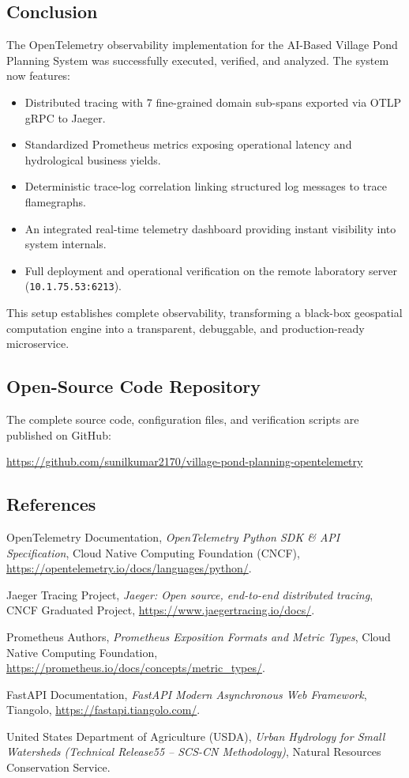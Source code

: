 \documentclass[11pt,a4paper]{article}
\begin{document}
\subsection{Conclusion}
The OpenTelemetry observability implementation for the AI-Based Village Pond Planning System was successfully executed, verified, and analyzed. The system now features:
\begin{itemize}[noitemsep]
    \item Distributed tracing with 7 fine-grained domain sub-spans exported via OTLP gRPC to Jaeger.
    \item Standardized Prometheus metrics exposing operational latency and hydrological business yields.
    \item Deterministic trace-log correlation linking structured log messages to trace flamegraphs.
    \item An integrated real-time telemetry dashboard providing instant visibility into system internals.
    \item Full deployment and operational verification on the remote laboratory server (\texttt{10.1.75.53:6213}).
\end{itemize}
This setup establishes complete observability, transforming a black-box geospatial computation engine into a transparent, debuggable, and production-ready microservice.

\subsection{Open-Source Code Repository}
The complete source code, configuration files, and verification scripts are published on GitHub:
\begin{center}
    \url{https://github.com/sunilkumar2170/village-pond-planning-opentelemetry}
\end{center}

\subsection{References}
\begin{enumerate}[leftmargin=*, label={[\arabic*]}]
    \item OpenTelemetry Documentation, \textit{OpenTelemetry Python SDK \& API Specification}, Cloud Native Computing Foundation (CNCF), \url{https://opentelemetry.io/docs/languages/python/}.
    \item Jaeger Tracing Project, \textit{Jaeger: Open source, end-to-end distributed tracing}, CNCF Graduated Project, \url{https://www.jaegertracing.io/docs/}.
    \item Prometheus Authors, \textit{Prometheus Exposition Formats and Metric Types}, Cloud Native Computing Foundation, \url{https://prometheus.io/docs/concepts/metric_types/}.
    \item FastAPI Documentation, \textit{FastAPI Modern Asynchronous Web Framework}, Tiangolo, \url{https://fastapi.tiangolo.com/}.
    \item United States Department of Agriculture (USDA), \textit{Urban Hydrology for Small Watersheds (Technical Release55 -- SCS-CN Methodology)}, Natural Resources Conservation Service.
\end{enumerate}
\end{document}
